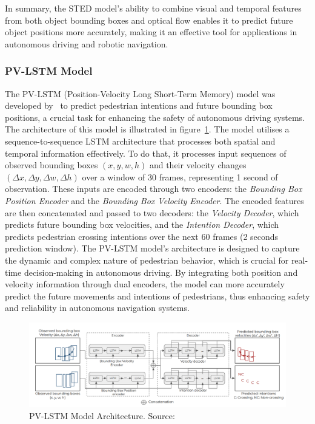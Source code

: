 \documentclass[12pt,oneside]{book} %
\begin{document}
In summary, the STED model’s ability to combine visual and temporal features
from both object bounding boxes and optical flow enables it to predict future
object positions more accurately, making it an effective tool for applications
in autonomous driving and robotic navigation.

\subsubsection*{PV-LSTM Model}

The PV-LSTM (Position-Velocity Long Short-Term Memory) model was developed
by~\citet{DBLP:journals/corr/abs-2010-10270} to predict pedestrian intentions
and future bounding box positions, a crucial task for enhancing the safety of
autonomous driving systems. The architecture of this model is illustrated in
figure~\ref{fig:pv-lstm}. The model utilises a sequence-to-sequence LSTM
architecture that processes both spatial and temporal information effectively.
To do that, it processes input sequences of observed bounding boxes $(x, y, w,
    h)$ and their velocity changes $(\Delta x, \Delta y, \Delta w, \Delta h)$ over
a window of 30 frames, representing 1 second of observation. These inputs are
encoded through two encoders: the \textit{Bounding Box Position Encoder} and
the \textit{Bounding Box Velocity Encoder}. The encoded features are then
concatenated and passed to two decoders: the \textit{Velocity Decoder}, which
predicts future bounding box velocities, and the \textit{Intention Decoder},
which predicts pedestrian crossing intentions over the next 60 frames (2
seconds prediction window). The PV-LSTM model’s architecture is designed to
capture the dynamic and complex nature of pedestrian behavior, which is crucial
for real-time decision-making in autonomous driving. By integrating both
position and velocity information through dual encoders, the model can more
accurately predict the future movements and intentions of pedestrians, thus
enhancing safety and reliability in autonomous navigation systems.

\begin{figure}[H]
    \centering
    \includegraphics[width=1\textwidth]{figures/PV-LSTM.png}
    \caption{PV-LSTM Model Architecture. Source:~\citet{DBLP:journals/corr/abs-2010-10270}}\label{fig:pv-lstm}
\end{figure}
\end{document}
